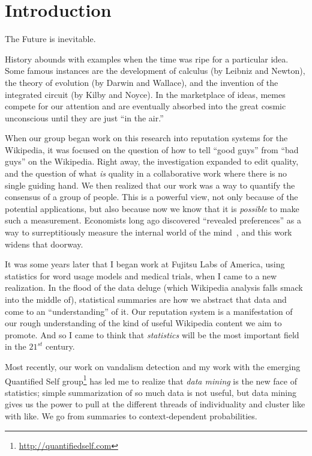 \section{Introduction}

The Future is inevitable.

History abounds with examples when the time was ripe for a particular idea.
Some famous instances are the development of calculus (by Leibniz and Newton),
the theory of evolution (by Darwin and Wallace), and the invention of
the integrated circuit (by Kilby and Noyce).
In the marketplace of ideas, memes compete for our attention and
are eventually absorbed into the great cosmic unconscious until
they are just ``in the air.''

When our group began work on this research into reputation systems for
the Wikipedia, it was focused on the
question of how to tell ``good guys'' from ``bad guys'' on the Wikipedia.
Right away, the investigation expanded to edit quality, and the question of what
\textit{is} quality in a collaborative work where there is no single
guiding hand.
We then realized that our work was a
way to quantify the consensus of a group of people.
This is a powerful view, not only because of the potential
applications, but also because now we know that it is \textit{possible}
to make such a measurement.
Economists long ago discovered ``revealed preferences''
as a way to surreptitiously measure the internal world of the
mind~\cite{Samuelson1938,Varian2006}, and this work widens that doorway.

It was some years later that I began work at Fujitsu Labs of America,
using statistics for word usage models and medical trials,
when I came to a new realization.
In the flood of the data deluge (which Wikipedia analysis falls smack
into the middle of), statistical summaries are how we abstract that data
and come to an ``understanding'' of it.
Our reputation system is a manifestation of our
rough understanding of the kind of useful Wikipedia content we aim to
promote.
And so I came to think that \textit{statistics} will be the
most important field in the $21^{st}$ century.

Most recently, our work on vandalism detection and my work with the
emerging Quantified Self group\footnote{\url{http://quantifiedself.com}}
has led me to realize that
\textit{data mining} is the new face of statistics; simple summarization
of so much data is not useful, but data mining gives us the power to
pull at the different threads of individuality and cluster like with like.
We go from summaries to context-dependent probabilities.

